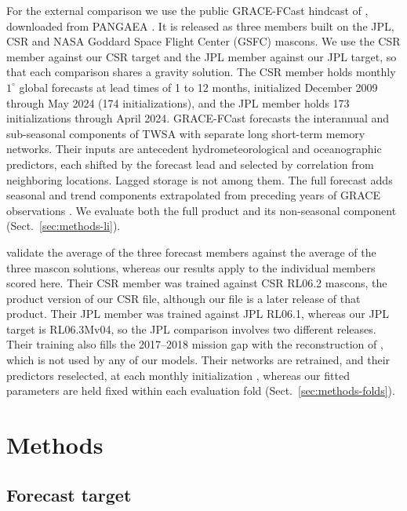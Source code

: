 \documentclass[hess, manuscript]{copernicus}
\begin{document}
For the external comparison we use the public GRACE-FCast hindcast of
\citet{li2026fcast}, downloaded from PANGAEA \citep{li2025pangaea}. It is
released as three members built on the JPL, CSR and NASA Goddard Space
Flight Center (GSFC) mascons. We use
the CSR member against our CSR target and the JPL member against our JPL
target, so that each comparison shares a gravity solution. The CSR member
holds monthly $1^{\circ}$ global forecasts at lead times of 1 to 12 months,
initialized December 2009 through May 2024 (174 initializations), and the JPL member holds 173 initializations through April 2024.
GRACE-FCast forecasts the interannual and sub-seasonal components of TWSA
with separate long short-term memory networks. Their inputs are antecedent
hydrometeorological and oceanographic predictors, each shifted by the
forecast lead and selected by correlation from neighboring locations.
Lagged storage is not among them. The full forecast adds seasonal and
trend components extrapolated from preceding years of GRACE observations
\citep{li2026fcast}. We evaluate both the full product and its
non-seasonal component (Sect.~\ref{sec:methods-li}).

\citet{li2026fcast} validate the average of the three forecast members
against the average of the three mascon solutions, whereas our results
apply to the individual members scored here.
Their CSR member was trained against CSR RL06.2 mascons, the product
version of our CSR file, although our file is a later release of that
product. Their JPL member was trained against JPL RL06.1, whereas our JPL
target is RL06.3Mv04, so the JPL comparison involves two different
releases.
Their training also fills the 2017--2018 mission gap with the
reconstruction of \citet{yin2023gtws}, which is not used by any of our models.
Their networks are retrained, and their predictors reselected, at each
monthly initialization \citep{li2026fcast}, whereas our fitted parameters
are held fixed within each evaluation fold (Sect.~\ref{sec:methods-folds}).

\section{Methods}
\label{sec:methods}

\subsection{Forecast target}
\label{sec:methods-target}
\end{document}
